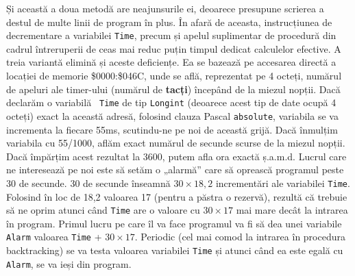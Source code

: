 Și această a doua metodă are neajunsurile ei, deoarece presupune scrierea a
destul de multe linii de program în plus. În afară de aceasta, instrucțiunea
de decrementare a variabilei {\tt Time}, precum și apelul suplimentar de
procedură din cadrul întreruperii de ceas mai reduc puțin timpul dedicat
calculelor efective. A treia variantă elimină și aceste deficiențe. Ea se
bazează pe accesarea directă a locației de memorie \$0000:\$046C, unde se
află, reprezentat pe 4 octeți, numărul de apeluri ale timer-ului (numărul de
{\bf tacți}) începând de la miezul nopții. Dacă declarăm o variabilă {\tt
  Time} de tip {\tt Longint} (deoarece acest tip de date ocupă 4 octeți) exact
la această adresă, folosind clauza Pascal {\tt absolute}, variabila se va
incrementa la fiecare 55ms, scutindu-ne pe noi de această grijă. Dacă înmulțim
variabila cu 55/1000, aflăm exact numărul de secunde scurse de la miezul
nopții. Dacă împărțim acest rezultat la 3600, putem afla ora exactă
ș.a.m.d. Lucrul care ne interesează pe noi este să setăm o „alarmă” care să
oprească programul peste 30 de secunde. 30 de secunde înseamnă $30 \times
18,2$ incrementări ale variabilei {\tt Time}. Folosind în loc de 18,2 valoarea
17 (pentru a păstra o rezervă), rezultă că trebuie să ne oprim atunci când
{\tt Time} are o valoare cu $30 \times 17$ mai mare decât la intrarea în
program. Primul lucru pe care îl va face programul va fi să dea unei variabile
{\tt Alarm} valoarea {\tt Time} + $30 \times 17$. Periodic (cel mai comod la
intrarea în procedura backtracking) se va testa valoarea variabilei {\tt Time}
și atunci când ea este egală cu {\tt Alarm}, se va ieși din program.

